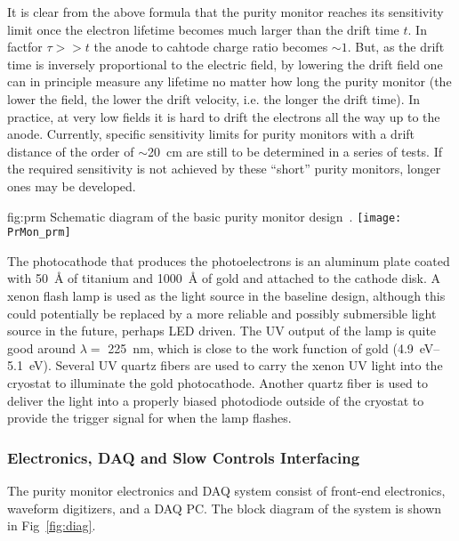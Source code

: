 It is clear from the above formula that the purity monitor reaches its sensitivity limit once the electron lifetime becomes much larger than the drift time $t$. In factfor $\tau >> t$ the anode to cahtode charge ratio becomes $\sim 1$. But, as the drift time is inversely proportional to the electric field, by lowering the drift field one can in principle measure any lifetime no matter how long the purity monitor (the lower the field, the lower the drift velocity, i.e. the longer the drift time). In practice, at very low fields it is hard to drift the electrons all the way up to the anode. Currently, specific sensitivity limits for purity monitors with a drift distance of the order of $\sim$\SI{20}{\centi\meter} are still to be determined in a series of tests. If the required sensitivity is not achieved by these ``short'' purity monitors, longer ones may be developed.

\begin{dunefigure}{fig:prm}
  {Schematic diagram of the basic purity monitor design~\cite{Adamowski:2014daa}.}
  \texttt{[image: PrMon\_prm]}
\end{dunefigure}

The photocathode that produces the photoelectrons is an aluminum plate coated with \SI{50}{\angstrom} of titanium and \SI{1000}{\angstrom} of gold and attached to the cathode disk. A xenon flash lamp is used as the light source in the baseline design, although this could potentially be replaced by a more reliable and possibly submersible light source in the future, perhaps LED driven. The UV output of the lamp is quite good around $\lambda=$ \SI{225}{\nano\meter}, which is close to the work function of gold (\SIrange{4.9}{5.1}{\eV}). Several UV quartz fibers are used to carry the xenon UV light into the cryostat to illuminate the gold photocathode.   Another quartz fiber is used to deliver the light into a properly biased photodiode outside of the cryostat to provide the trigger signal for when the lamp flashes. 

\subsubsection{Electronics, DAQ and Slow Controls Interfacing}
The purity monitor electronics and DAQ system consist of front-end electronics, waveform digitizers, and a DAQ PC.  The block diagram of the system is shown in Fig~\ref{fig:diag}. 

